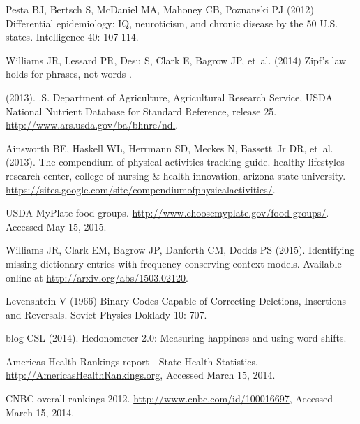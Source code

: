 \documentclass[10pt]{article}
\begin{document}
\begin{thebibliography}{10}
Pesta BJ, Bertsch S, McDaniel MA, Mahoney CB, Poznanski PJ (2012) Differential
  epidemiology: {I}{Q}, neuroticism, and chronic disease by the 50 {U}.{S}.
  states.
\newblock Intelligence 40: 107-114.

Williams JR, Lessard PR, Desu S, Clark E, Bagrow JP, et~al. (2014) Zipf's law
  holds for phrases, not words .

 (2013).
.{S}. {D}epartment of {A}griculture, {A}gricultural {R}esearch
  {S}ervice, {U}{S}{D}{A} {N}ational {N}utrient {D}atabase for {S}tandard
  {R}eference, release 25.
\newblock \urlprefix\url{http://www.ars.usda.gov/ba/bhnrc/ndl}.

Ainsworth BE, Haskell WL, Herrmann SD, Meckes N, Bassett~Jr DR, et~al. (2013).
\newblock The compendium of physical activities tracking guide. healthy
  lifestyles research center, college of nursing \& health innovation, arizona
  state university.
\newblock
  \urlprefix\url{https://sites.google.com/site/compendiumofphysicalactivities/}.

{U}{S}{D}{A} {M}y{P}late food groups.
\newblock \urlprefix\url{http://www.choosemyplate.gov/food-groups/}.
\newblock Accessed May 15, 2015.

Williams JR, Clark EM, Bagrow JP, Danforth CM, Dodds PS (2015).
\newblock Identifying missing dictionary entries with frequency-conserving
  context models.
\newblock Available online at
  \href{http://arxiv.org/abs/1503.02120}{http://arxiv.org/abs/1503.02120}.

Levenshtein V (1966) {Binary Codes Capable of Correcting Deletions, Insertions
  and Reversals}.
\newblock Soviet Physics Doklady 10: 707.

blog CSL (2014).
\newblock Hedonometer 2.0: Measuring happiness and using word shifts.

Americas {H}ealth {R}ankings report---{S}tate {H}ealth {S}tatistics.
\newblock \url{http://AmericasHealthRankings.org}, Accessed March 15, 2014.

C{N}{B}{C} overall rankings 2012.
\newblock \url{http://www.cnbc.com/id/100016697}, Accessed March 15, 2014.


\end{thebibliography}
\end{document}
